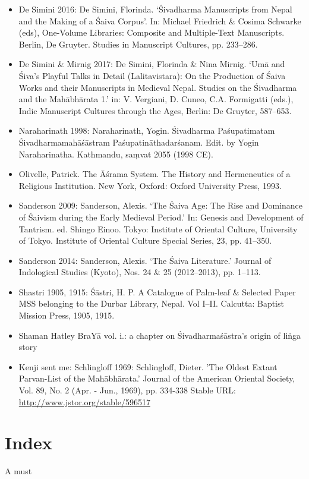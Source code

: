 \documentclass[11pt]{article}
\begin{document}
\begin{itemize}
\item De Simini 2016: De Simini, Florinda. ‘Śivadharma Manuscripts from Nepal and the Making of a Śaiva Corpus’. In: Michael Friedrich \& Cosima Schwarke (eds), One-Volume Libraries: Composite and Multiple-Text Manuscripts. Berlin, De Gruyter. Studies in Manuscript Cultures, pp. 233--286.

\item De Simini \& Mirnig 2017: De Simini, Florinda \& Nina Mirnig. ‘Umā and Śiva’s Playful Talks in Detail (Lalitavistara): On the Production of Śaiva Works and their Manuscripts in Medieval Nepal. Studies on the Śivadharma and the Mahābhārata 1.’ in: V. Vergiani, D. Cuneo, C.A. Formigatti (eds.), Indic Manuscript Cultures through the Ages, Berlin: De Gruyter, 587--653.

\item Naraharinath 1998: Naraharinath, Yogin. Śivadharma Paśupatimatam Śivadharmamahāśāstram Paśupatināthadarśanam. Edit. by Yogin Naraharinatha. Kathmandu, saṃvat 2055 (1998 CE).

\item Olivelle, Patrick. The Āśrama System. The History and Hermeneutics of a Religious Institution. New York, Oxford: Oxford University Press, 1993.

\item Sanderson 2009: Sanderson, Alexis. ‘The Śaiva Age: The Rise and Dominance of Śaivism during the Early Medieval Period.’ In: Genesis and Development of Tantrism. ed. Shingo Einoo. Tokyo: Institute of Oriental Culture, University of Tokyo. Institute of Oriental Culture Special Series, 23, pp. 41--350.

\item Sanderson 2014: Sanderson, Alexis. ‘The Śaiva Literature.’ Journal of Indological Studies (Kyoto), Nos. 24 \& 25 (2012--2013), pp. 1--113.

\item Shastri 1905, 1915: Śāstri, H. P. A Catalogue of Palm-leaf \& Selected Paper MSS belonging to the Durbar Library, Nepal. Vol I--II. Calcutta: Baptist Mission Press, 1905, 1915.

\item Shaman Hatley BraYā vol. i.: a chapter on Śivadharmaśāstra's origin of liṅga story

\item Kenji sent me:
Schlingloff 1969: Schlingloff, Dieter. 'The Oldest Extant Parvan-List of the Mahābhārata.'
Journal of the American Oriental Society, Vol. 89, No. 2 (Apr. - Jun., 1969), pp. 334-338
Stable URL: \url{http://www.jstor.org/stable/596517}
\end{itemize}

\section{Index}
\label{sec:org10d9891}
A must
\end{document}
